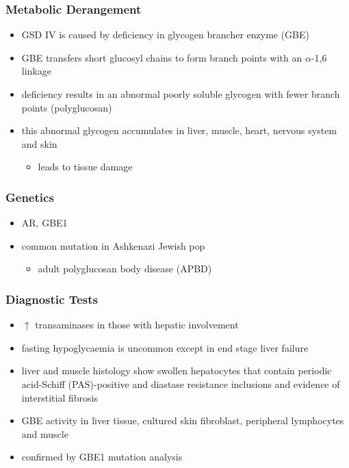 \documentclass{scrartcl}
\begin{document}
\subsubsection{Metabolic Derangement}
\label{sec:org9e15ee0}
\begin{itemize}
\item GSD IV is caused by deficiency in glycogen brancher enzyme (GBE)
\item GBE transfers short glucosyl chains to form branch points with an
\(\alpha\)-1,6 linkage
\item deficiency results in an abnormal poorly soluble glycogen with fewer branch points (polyglucosan)
\item this abnormal glycogen accumulates in liver, muscle, heart, nervous system and skin
\begin{itemize}
\item leads to tissue damage
\end{itemize}
\end{itemize}

\subsubsection{Genetics}
\label{sec:orgb9b1cf2}
\begin{itemize}
\item AR, GBE1
\item common mutation in Ashkenazi Jewish pop
\begin{itemize}
\item adult polyglucosan body disease (APBD)
\end{itemize}
\end{itemize}

\subsubsection{Diagnostic Tests}
\label{sec:orge10c593}

\begin{itemize}
\item \(\uparrow\) transaminases in those with hepatic involvement
\item fasting hypoglycaemia is uncommon except in end stage liver failure
\item liver and muscle histology show swollen hepatocytes that contain
periodic acid-Schiff (PAS)-positive and diastase resistance
inclusions and evidence of interstitial fibrosis
\item GBE activity in liver tissue, cultured skin fibroblast, peripheral
lymphocytes and muscle
\item confirmed by GBE1 mutation analysis
\end{itemize}
\end{document}
